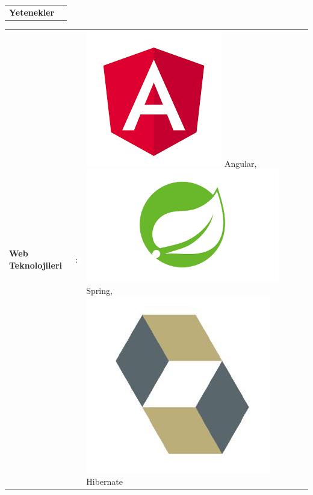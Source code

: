 \documentclass[paper=a4,fontsize=11pt]{temp} %
\begin{document}
\begin{minipage}[t]{0.33\textwidth} 

\begin{tabular}[t]{ l l }
\textbf{Yetenekler}
\end{tabular}

\sepspace

\end{minipage}
%
\begin{minipage}[t]{0.66\textwidth} 



\begin{tabular}{llllll}
\textbf{Web Teknolojileri}   & : & \includegraphics[scale=0.04]{IMG/tech/angular} Angular, \includegraphics[scale=0.04]{IMG/tech/spring}Spring, \includegraphics[scale=0.04]{IMG/tech/hibernate} Hibernate                 &  &  &  \\

\end{tabular}
\end{minipage}
\end{document}
